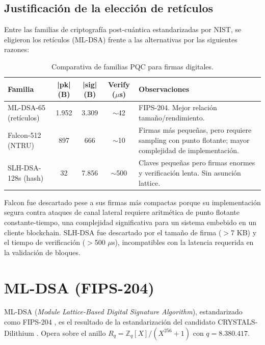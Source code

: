 \subsection{Justificación de la elección de retículos}

Entre las familias de criptografía post-cuántica estandarizadas por NIST, se eligieron los retículos (ML-DSA) frente a las alternativas por las siguientes razones:

\begin{table}[htbp]
\centering
\caption{Comparativa de familias PQC para firmas digitales.}
\label{tab:pqc_families}
\begin{tabular}{@{}lcccL{4.5cm}@{}}
\toprule
\textbf{Familia} & \textbf{|pk| (B)} & \textbf{|sig| (B)} & \textbf{Verify ($\mu$s)} & \textbf{Observaciones} \\
\midrule
ML-DSA-65 (retículos) & 1.952 & 3.309 & $\sim$42 & FIPS-204. Mejor relación tamaño/rendimiento. \\
Falcon-512 (NTRU) & 897 & 666 & $\sim$10 & Firmas más pequeñas, pero requiere sampling con punto flotante; mayor complejidad de implementación. \\
SLH-DSA-128s (hash) & 32 & 7.856 & $\sim$500 & Claves pequeñas pero firmas enormes y verificación lenta. Sin asunción lattice. \\
\bottomrule
\end{tabular}
\end{table}

Falcon fue descartado pese a sus firmas más compactas porque su implementación segura contra ataques de canal lateral requiere aritmética de punto flotante constante-tiempo, una complejidad significativa para un sistema embebido en un cliente blockchain. SLH-DSA fue descartado por el tamaño de firma ($>$7 KB) y el tiempo de verificación ($>$500 $\mu$s), incompatibles con la latencia requerida en la validación de bloques.


\section{ML-DSA (FIPS-204)}
\label{sec:mldsa}

ML-DSA (\emph{Module Lattice-Based Digital Signature Algorithm}), estandarizado como FIPS-204 \parencite{nistfips204}, es el resultado de la estandarización del candidato CRYSTALS-Dilithium \parencite{ducas2018dilithium}. Opera sobre el anillo $R_q = \mathbb{Z}_q[X]/(X^{256} + 1)$ con $q = 8.380.417$.

